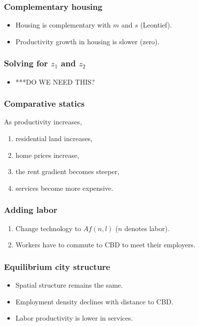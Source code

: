 \documentclass[handout,compress,mathserif]{beamer}
\begin{document}


\begin{frame}\frametitle{Complementary housing}
\begin{itemize}
    \item Housing is complementary with $m$ and $s$ (Leontief).
    \item Productivity growth in housing is slower (zero).
\end{itemize}
\end{frame}


\begin{frame}\frametitle{Solving for $z_1$ and $z_2$}
\begin{itemize}
    \item ***DO WE NEED THIS?
\end{itemize}
\end{frame}


\begin{frame}\frametitle{Comparative statics}
As productivity increases,
\begin{enumerate}
    \item residential land increases,
    \item home prices increase,
    \item the rent gradient becomes steeper,
    \item services become more expensive.
\end{enumerate}
\end{frame}

\begin{frame}\frametitle{Adding labor}
\begin{enumerate}
    \item Change technology to $Af(n,l)$ ($n$ denotes labor).
    \item Workers have to commute to CBD to meet their employers.
\end{enumerate}
\end{frame}

\begin{frame}\frametitle{Equilibrium city structure}
\begin{itemize}
    \item Spatial structure remains the same.
    \item Employment density declines with distance to CBD.
    \item Labor productivity is lower in services.
\end{itemize}
\end{frame}
\end{document}
